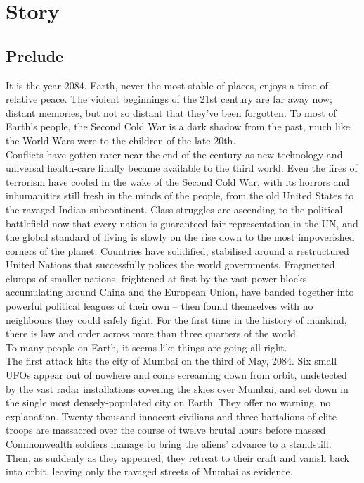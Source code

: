 \newpage

\section{Story}
\subsection{Prelude}
It is the year 2084. Earth, never the most stable of places, enjoys a time of relative peace. The violent beginnings of the 21st century are far away now; distant memories, but not so distant that they've been forgotten. To most of Earth's people, the Second Cold War is a dark shadow from the past, much like the World Wars were to the children of the late 20th.\\
Conflicts have gotten rarer near the end of the century as new technology and universal health-care finally became available to the third world. Even the fires of terrorism have cooled in the wake of the Second Cold War, with its horrors and inhumanities still fresh in the minds of the people, from the old United States to the ravaged Indian subcontinent. Class struggles are ascending to the political battlefield now that every nation is guaranteed fair representation in the UN, and the global standard of living is slowly on the rise down to the most impoverished corners of the planet. Countries have solidified, stabilised around a restructured United Nations that successfully polices the world governments. Fragmented clumps of smaller nations, frightened at first by the vast power blocks accumulating around China and the European Union, have banded together into powerful political leagues of their own -- then found themselves with no neighbours they could safely fight. For the first time in the history of mankind, there is law and order across more than three quarters of the world.\\
To many people on Earth, it seems like things are going all right.\\
The first attack hits the city of Mumbai on the third of May, 2084. Six small UFOs appear out of nowhere and come screaming down from orbit, undetected by the vast radar installations covering the skies over Mumbai, and set down in the single most densely-populated city on Earth. They offer no warning, no explanation. Twenty thousand innocent civilians and three battalions of elite troops are massacred over the course of twelve brutal hours before massed Commonwealth soldiers manage to bring the aliens' advance to a standstill. Then, as suddenly as they appeared, they retreat to their craft and vanish back into orbit, leaving only the ravaged streets of Mumbai as evidence.\\
